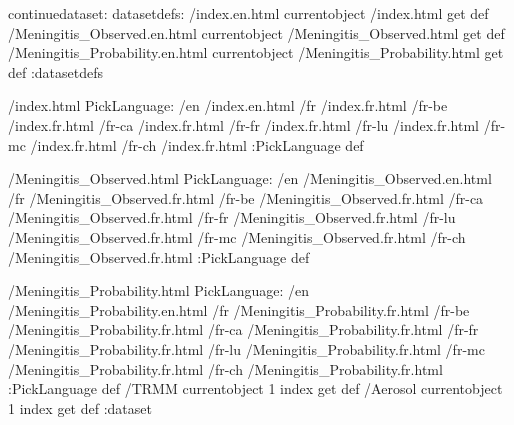 \begin{ingrid}
continuedataset:
datasetdefs:
/index.en.html currentobject /index.html get def
/Meningitis_Observed.en.html currentobject /Meningitis_Observed.html get def
/Meningitis_Probability.en.html currentobject /Meningitis_Probability.html get def
:datasetdefs

/index.html {
PickLanguage:
/en /index.en.html
/fr /index.fr.html
/fr-be /index.fr.html
/fr-ca /index.fr.html
/fr-fr /index.fr.html
/fr-lu /index.fr.html
/fr-mc /index.fr.html
/fr-ch /index.fr.html
:PickLanguage
} def

/Meningitis_Observed.html {
PickLanguage:
/en /Meningitis_Observed.en.html
/fr /Meningitis_Observed.fr.html
/fr-be /Meningitis_Observed.fr.html
/fr-ca /Meningitis_Observed.fr.html
/fr-fr /Meningitis_Observed.fr.html
/fr-lu /Meningitis_Observed.fr.html
/fr-mc /Meningitis_Observed.fr.html
/fr-ch /Meningitis_Observed.fr.html
:PickLanguage
} def

/Meningitis_Probability.html {
PickLanguage:
/en /Meningitis_Probability.en.html
/fr /Meningitis_Probability.fr.html
/fr-be /Meningitis_Probability.fr.html
/fr-ca /Meningitis_Probability.fr.html
/fr-fr /Meningitis_Probability.fr.html
/fr-lu /Meningitis_Probability.fr.html
/fr-mc /Meningitis_Probability.fr.html
/fr-ch /Meningitis_Probability.fr.html
:PickLanguage
} def
/TRMM currentobject 1 index get def
/Aerosol currentobject 1 index get def
:dataset
\end{ingrid}
